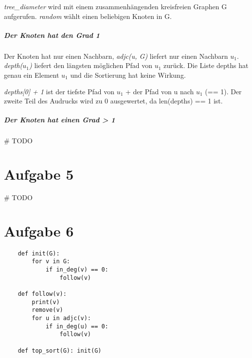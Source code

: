 \documentclass[a4paper,10pt]{scrartcl}
\begin{document}
\emph{tree\_diameter} wird mit einem zusammenhängenden kreisfreien Graphen G aufgerufen.
\emph{random} wählt einen beliebigen Knoten in G.

\subparagraph{Der Knoten hat den Grad 1}

Der Knoten hat nur einen Nachbarn, \emph{adjc(u, G)} liefert nur einen Nachbarn $u_1$.
\emph{depth($u_1$)} liefert den längsten möglichen Pfad von $u_1$ zurück.
Die Liste depths hat genau ein Element $u_1$ und die Sortierung hat keine Wirkung.

\emph{depths[0] + 1} ist der tiefste Pfad von $u_1$ + der Pfad von u nach $u_1$ (== 1).
Der zweite Teil des Audrucks wird zu 0 ausgewertet, da len(depths) == 1 ist.

\subparagraph{Der Knoten hat einen Grad > 1}

\# TODO

\section*{Aufgabe 5}

\# TODO

\section*{Aufgabe 6}

\begin{verbatim}
    def init(G):
        for v in G:
            if in_deg(v) == 0:
                follow(v)

    def follow(v):
        print(v)
        remove(v)
        for u in adjc(v):
            if in_deg(u) == 0:
                follow(v)

    def top_sort(G): init(G)
\end{verbatim}
\end{document}
